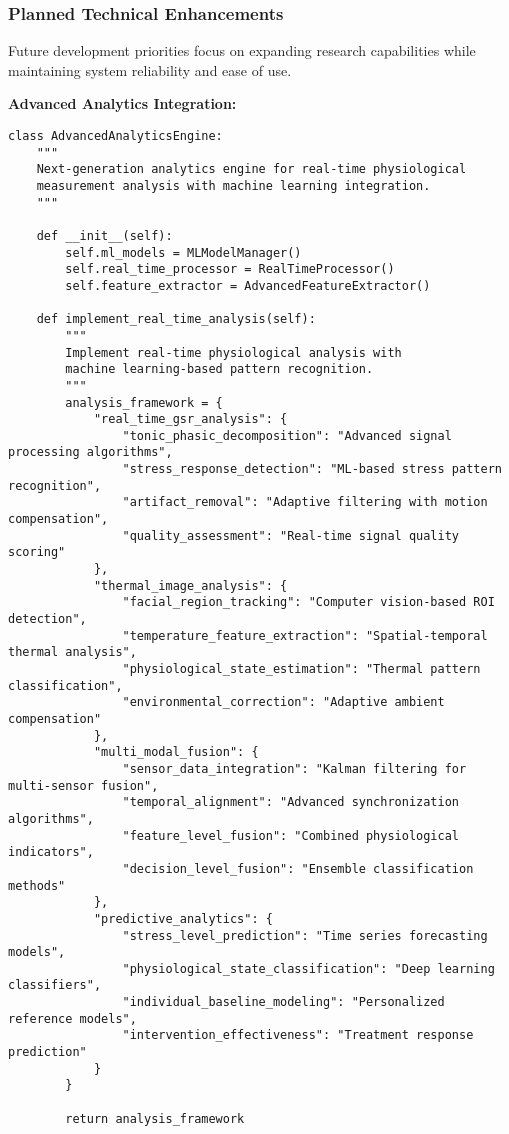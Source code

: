 \documentclass[11pt,a4paper]{article}
\begin{document}
\subsubsection{Planned Technical Enhancements}

Future development priorities focus on expanding research capabilities while maintaining system reliability and ease of
use.

\textbf{Advanced Analytics Integration:}

\begin{verbatim}
class AdvancedAnalyticsEngine:
    """
    Next-generation analytics engine for real-time physiological
    measurement analysis with machine learning integration.
    """

    def __init__(self):
        self.ml_models = MLModelManager()
        self.real_time_processor = RealTimeProcessor()
        self.feature_extractor = AdvancedFeatureExtractor()

    def implement_real_time_analysis(self):
        """
        Implement real-time physiological analysis with
        machine learning-based pattern recognition.
        """
        analysis_framework = {
            "real_time_gsr_analysis": {
                "tonic_phasic_decomposition": "Advanced signal processing algorithms",
                "stress_response_detection": "ML-based stress pattern recognition",
                "artifact_removal": "Adaptive filtering with motion compensation",
                "quality_assessment": "Real-time signal quality scoring"
            },
            "thermal_image_analysis": {
                "facial_region_tracking": "Computer vision-based ROI detection",
                "temperature_feature_extraction": "Spatial-temporal thermal analysis",
                "physiological_state_estimation": "Thermal pattern classification",
                "environmental_correction": "Adaptive ambient compensation"
            },
            "multi_modal_fusion": {
                "sensor_data_integration": "Kalman filtering for multi-sensor fusion",
                "temporal_alignment": "Advanced synchronization algorithms",
                "feature_level_fusion": "Combined physiological indicators",
                "decision_level_fusion": "Ensemble classification methods"
            },
            "predictive_analytics": {
                "stress_level_prediction": "Time series forecasting models",
                "physiological_state_classification": "Deep learning classifiers",
                "individual_baseline_modeling": "Personalized reference models",
                "intervention_effectiveness": "Treatment response prediction"
            }
        }

        return analysis_framework
\end{verbatim}
\end{document}
